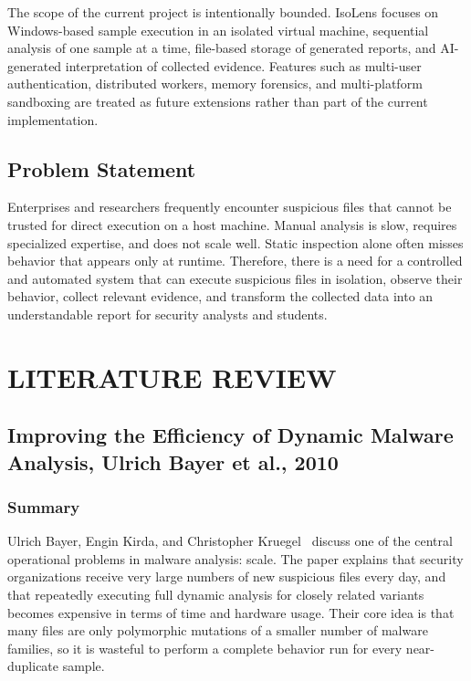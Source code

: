 \documentclass[a4paper,12pt,oneside]{report}
\begin{document}
\par

\par

The scope of the current project is intentionally bounded. IsoLens focuses on Windows-based sample execution in an isolated virtual machine, sequential analysis of one sample at a time, file-based storage of generated reports, and AI-generated interpretation of collected evidence. Features such as multi-user authentication, distributed workers, memory forensics, and multi-platform sandboxing are treated as future extensions rather than part of the current implementation.

\section{Problem Statement}
Enterprises and researchers frequently encounter suspicious files that cannot be trusted for direct execution on a host machine. Manual analysis is slow, requires specialized expertise, and does not scale well. Static inspection alone often misses behavior that appears only at runtime. Therefore, there is a need for a controlled and automated system that can execute suspicious files in isolation, observe their behavior, collect relevant evidence, and transform the collected data into an understandable report for security analysts and students.

\chapter{LITERATURE REVIEW}
\section{Improving the Efficiency of Dynamic Malware Analysis, Ulrich Bayer et al., 2010}

\subsection{Summary}
Ulrich Bayer, Engin Kirda, and Christopher Kruegel~\cite{bayer2010} discuss one of the central operational problems in malware analysis: scale. The paper explains that security organizations receive very large numbers of new suspicious files every day, and that repeatedly executing full dynamic analysis for closely related variants becomes expensive in terms of time and hardware usage. Their core idea is that many files are only polymorphic mutations of a smaller number of malware families, so it is wasteful to perform a complete behavior run for every near-duplicate sample.
\end{document}
